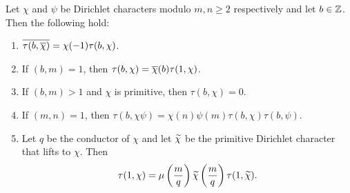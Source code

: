         \begin{proposition}\label{prop:Gauss_sum_reduction}
          Let $\chi$ and $\psi$ be Dirichlet characters modulo $m,n \ge 2$ respectively and let $b \in \mathbb{Z}$. Then the following hold:
          \begin{enumerate}[label=(\roman*)]
            \item $\overline{\tau(b,\overline{\chi})} = \chi(-1)\tau(b,\chi)$.
            \item If $(b,m) = 1$, then $\tau(b,\chi) = \overline{\chi}(b)\tau(1,\chi)$.
            \item If $(b,m) > 1$ and $\chi$ is primitive, then $\tau(b,\chi) = 0$.
            \item If $(m,n) = 1$, then $\tau(b,\chi\psi) = \chi(n)\psi(m)\tau(b,\chi)\tau(b,\psi)$.
            \item Let $q$ be the conductor of $\chi$ and let $\widetilde{\chi}$ be the primitive Dirichlet character that lifts to $\chi$. Then
            \[
              \tau(1,\chi) = \mu\left(\frac{m}{q}\right)\widetilde{\chi}\left(\frac{m}{q}\right)\tau(1,\widetilde{\chi}).
            \]
          \end{enumerate}
        \end{proposition}
